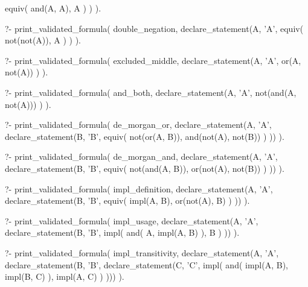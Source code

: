 \begin{fact}
\begin{prolog}
		equiv(
			and(A, A),
			A
		)
	)
).
\end{prolog}
\begin{prolog}
?- print_validated_formula(
	double_negation,
	declare_statement(A, 'A',
		equiv(
			not(not(A)),
			A
		)
	)
).
\end{prolog}
\begin{prolog}
?- print_validated_formula(
	excluded_middle,
	declare_statement(A, 'A',
		or(A, not(A))
	)
).
\end{prolog}
\begin{prolog}
?- print_validated_formula(
	and_both,
	declare_statement(A, 'A',
		not(and(A, not(A)))
	)
).
\end{prolog}
\begin{prolog}
?- print_validated_formula(
	de_morgan_or,
	declare_statement(A, 'A', declare_statement(B, 'B',
		equiv(
			not(or(A, B)),
			and(not(A), not(B))
		)
	))
).
\end{prolog}
\begin{prolog}
?- print_validated_formula(
	de_morgan_and,
	declare_statement(A, 'A', declare_statement(B, 'B',
		equiv(
			not(and(A, B)),
			or(not(A), not(B))
		)
	))
).
\end{prolog}
\begin{prolog}
?- print_validated_formula(
	impl_definition,
	declare_statement(A, 'A', declare_statement(B, 'B',
		equiv(
			impl(A, B),
			or(not(A), B)
		)
	))
).
\end{prolog}
\begin{prolog}
?- print_validated_formula(
	impl_usage,
	declare_statement(A, 'A', declare_statement(B, 'B',
		impl(
			and(
				A,
				impl(A, B)
			),
			B
		)
	))
).
\end{prolog}
\begin{prolog}
?- print_validated_formula(
	impl_transitivity,
	declare_statement(A, 'A', declare_statement(B, 'B', declare_statement(C, 'C',
		impl(
			and(
				impl(A, B),
				impl(B, C)
			),
			impl(A, C)
		)
	)))
).
\end{prolog}
\begin{prolog}

\end{prolog}
\end{fact}
